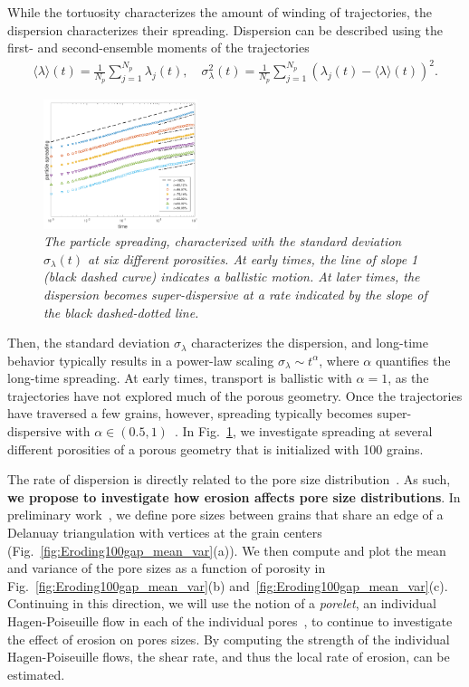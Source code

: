 \documentclass[11pt]{article}
\begin{document}
While the tortuosity characterizes the amount of winding of trajectories, the dispersion characterizes their spreading.  Dispersion can be described using the first- and second-ensemble moments of the trajectories
\begin{align}
  \langle \lambda \rangle (t) = \frac{1}{N_p} 
      \sum_{j=1}^{N_p} \lambda_j(t), \quad
  \sigma_\lambda^{2}(t) = \frac{1}{N_p}
    \sum_{j=1}^{N_p} (\lambda_j(t) - \langle \lambda \rangle(t))^2.
\end{align}
\begin{figure}
  \includegraphics[width=0.4\textwidth]{figs/100b_second_moment_long_ref}
  \caption{\label{fig:100dispersion} \em The particle spreading, characterized with the standard deviation $\sigma_\lambda(t)$ at six different porosities. At early times, the line of slope 1 (black dashed curve) indicates a ballistic motion. At later times, the dispersion becomes super-dispersive at a rate indicated by the slope of the black dashed-dotted line.}
\end{figure}
Then, the standard deviation $\sigma_\lambda$ characterizes the dispersion, and long-time behavior typically results in a power-law scaling $\sigma_\lambda \sim t^{\alpha}$, where $\alpha$ quantifies the long-time spreading. At early times, transport is ballistic with $\alpha = 1$, as the trajectories have not explored much of the porous geometry.  Once the trajectories have traversed a few grains, however, spreading typically becomes super-dispersive with $\alpha \in (0.5,1)$~\cite{dea-leb-den-tar-bol-dav2013}. In Fig.~\ref{fig:100dispersion}, we investigate spreading at several different porosities of a porous geometry that is initialized with 100 grains.

The rate of dispersion is directly related to the pore size distribution~\cite{dea-qua-bir-jua2018}. As such, {\bf we propose to investigate how erosion affects pore size distributions}. In preliminary work~\cite{chi-moo-qua2019}, we define pore sizes between grains that share an edge of a Delanuay triangulation with vertices at the grain centers (Fig.~\ref{fig:Eroding100gap_mean_var}(a)).  We then compute and plot the mean and variance of the pore sizes as a function of porosity in Fig.~\ref{fig:Eroding100gap_mean_var}(b) and~\ref{fig:Eroding100gap_mean_var}(c). Continuing in this direction, we will use the notion of a {\em porelet}, an individual Hagen-Poiseuille flow in each of the individual pores~\cite{dea-qua-bir-jua2018}, to continue to investigate the effect of erosion on pores sizes. By computing the strength of the individual Hagen-Poiseuille flows, the shear rate, and thus the local rate of erosion, can be estimated.
\end{document}
